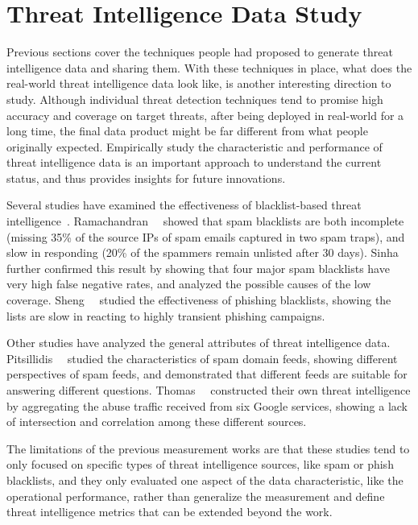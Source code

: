 \section{Threat Intelligence Data Study}
\label{sec:threat_intel_data}

Previous sections cover the techniques people had proposed to generate
threat intelligence data and sharing them. With these 
techniques in place, what does the real-world threat intelligence 
data look like, is another interesting direction to study. Although 
individual threat detection techniques tend to promise high accuracy and
coverage on target threats, after being deployed in real-world for a long
time, the final data product might be far different from what 
people originally expected. Empirically study the characteristic and 
performance of threat intelligence data is an important approach to 
understand the current status, and thus provides insights for future 
innovations.

Several studies have examined the effectiveness of blacklist-based 
threat intelligence~\cite{kuhrer2014paint, ramachandran2006revealing, 
ramachandran2007filtering, sheng2009empirical, sinha2008shades}.
Ramachandran~\etal~\cite{ramachandran2007filtering} showed that spam 
blacklists are both incomplete (missing 35\% of the source IPs of 
spam emails captured in two spam traps), and slow in responding 
(20\% of the spammers remain unlisted after 30 days).
Sinha~\etal~\cite{sinha2008shades} further confirmed this result by 
showing that four major spam blacklists have very high false negative
rates, and analyzed the possible causes of the low coverage.
Sheng~\etal~\cite{sheng2009empirical} studied the effectiveness of
phishing blacklists, showing the lists are slow in reacting to
highly transient phishing campaigns.

Other studies have analyzed the general attributes of threat
intelligence data. Pitsillidis~\etal~\cite{tasters:imc12} studied the
characteristics of spam domain feeds, showing different perspectives
of spam feeds, and demonstrated that different feeds are suitable for
answering different questions. Thomas~\etal~\cite{thomas2016abuse}
constructed their own threat intelligence by aggregating the abuse
traffic received from six Google services, showing a lack of
intersection and correlation among these different sources. 

The limitations of the previous measurement works are that these 
studies tend to only focused on specific types of threat intelligence 
sources, like spam or phish blacklists, and they only evaluated one 
aspect of the data characteristic, like the operational performance, 
rather than generalize the measurement and define threat intelligence 
metrics that can be extended beyond the work.

